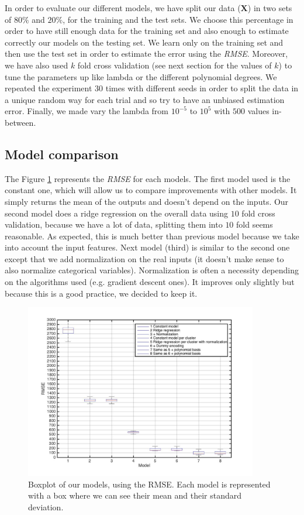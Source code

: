 \documentclass{article} %
\begin{document}
In order to evaluate our different models, we have split our data ($\mathbf{X}$) in two sets of $80\%$ and $20\%$, for the training and the test sets. We choose this percentage in order to have still enough data for the training set and also enough to estimate correctly our models on the testing set. We learn only on the training set and then use the test set in order to estimate the error using the \textit{RMSE}. Moreover, we have also used $k$ fold cross validation (see next section for the values of $k$) to tune the parameters up like lambda or the different polynomial degrees. We repeated the experiment $30$ times with different seeds in order to split the data in a unique random way for each trial and so try to have an unbiased estimation error. Finally, we made vary the lambda from $10^{-5}$ to $10^{5}$ with $500$ values in-between.

\subsection{Model comparison}

The Figure \ref{fig:models} represents the \textit{RMSE} for each models. The first model used is the constant one, which will allow us to compare improvements with other models. It simply returns the mean of the outputs and doesn't depend on the inputs. Our second model does a ridge regression on the overall data using $10$ fold cross validation, because we have a lot of data, splitting them into $10$ fold seems reasonable. As expected, this is much better than previous model because we take into account the input features. Next model (third) is similar to the second one except that we add normalization on the real inputs (it doesn't make sense to also normalize categorical variables). Normalization is often a necessity depending on the algorithms used (e.g. gradient descent ones). It improves only slightly but because this is a good practice, we decided to keep it.

\begin{figure}
\vspace{-1em}
\center
\includegraphics[width=4in]{figures/models.jpg} 
\vspace{-1em}
\caption{Boxplot of our models, using the RMSE. Each model is represented with a box where we can see their mean and their standard deviation.}
\label{fig:models}
\end{figure}
\end{document}
